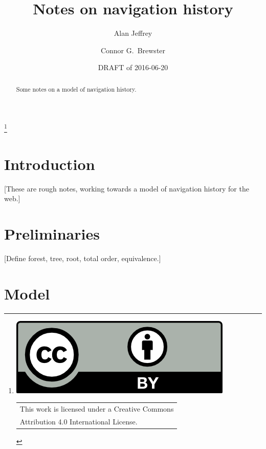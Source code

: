 \documentclass{article}
\title{Notes on navigation history}
\author{%
  Alan Jeffrey
  \and
  Connor G.~Brewster
}
\date{DRAFT of 2016-06-20}
\begin{document}
\maketitle

\let\thefootnote\relax\footnote{%
  \includegraphics[height=4.5ex]{images/by.png}
  \begin{tabular}[b]{@{}l}
    This work is licensed under a Creative Commons\\
    Attribution 4.0 International License.
  \end{tabular}
}

\begin{abstract}
  Some notes on a model of navigation history.
\end{abstract}

\section{Introduction}

[These are rough notes, working towards a model of navigation history for the web.]

\section{Preliminaries}

[Define forest, tree, root, total order, equivalence.]

\section{Model}
\end{document}
